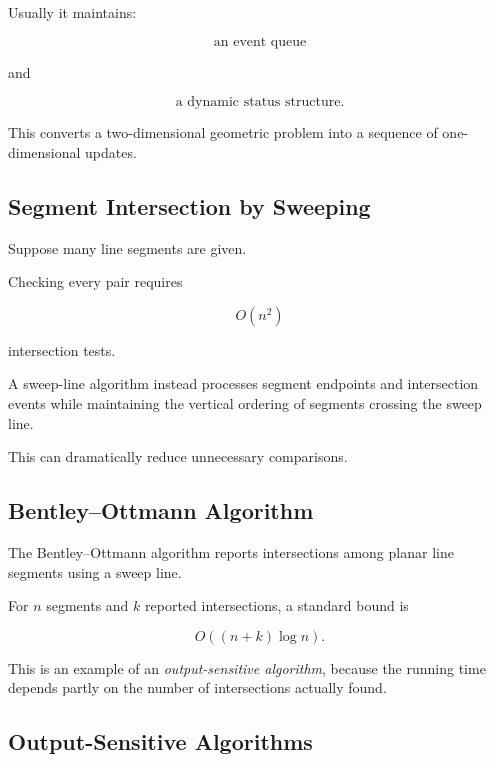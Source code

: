 Usually it maintains:

\[
\boxed{
\text{an event queue}
}
\]

and

\[
\boxed{
\text{a dynamic status structure}.
}
\]

This converts a two-dimensional geometric problem into a sequence of
one-dimensional updates.

\subsection{Segment Intersection by Sweeping}
\label{subsec:sweep-segment-intersection}

Suppose many line segments are given.

Checking every pair requires

\[
O(n^2)
\]

intersection tests.

A sweep-line algorithm instead processes segment endpoints and intersection
events while maintaining the vertical ordering of segments crossing the
sweep line.

This can dramatically reduce unnecessary comparisons.

\subsection{Bentley--Ottmann Algorithm}
\label{subsec:bentley-ottmann}

The Bentley--Ottmann algorithm reports intersections among planar line
segments using a sweep line.

For \(n\) segments and \(k\) reported intersections, a standard bound is

\[
\boxed{
O((n+k)\log n).
}
\]

This is an example of an \emph{output-sensitive algorithm}, because the
running time depends partly on the number of intersections actually found.

\subsection{Output-Sensitive Algorithms}
\label{subsec:output-sensitive-geometry}

